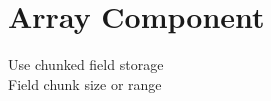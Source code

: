 \section{Array Component} \label{s:component-array}

Use chunked field storage \\
Field chunk size or range


